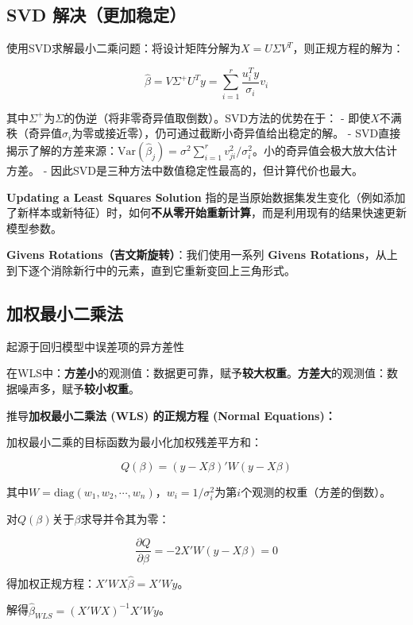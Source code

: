 \documentclass[
]{book}
\begin{document}
\subsection{SVD 解决（更加稳定）}\label{svd-ux89e3ux51b3ux66f4ux52a0ux7a33ux5b9a}

使用SVD求解最小二乘问题：将设计矩阵分解为\(X = U \Sigma V^T\)，则正规方程的解为：

\[\hat{\beta} = V \Sigma^{+} U^T y = \sum_{i=1}^{r} \frac{u_i^T y}{\sigma_i} v_i\]

其中\(\Sigma^{+}\)为\(\Sigma\)的伪逆（将非零奇异值取倒数）。SVD方法的优势在于：
- 即使\(X\)不满秩（奇异值\(\sigma_i\)为零或接近零），仍可通过截断小奇异值给出稳定的解。
- SVD直接揭示了解的方差来源：\(\text{Var}(\hat{\beta}_j) = \sigma^2 \sum_{i=1}^{r} v_{ji}^2 / \sigma_i^2\)。小的奇异值会极大放大估计方差。
- 因此SVD是三种方法中数值稳定性最高的，但计算代价也最大。

\textbf{Updating a Least Squares Solution} 指的是当原始数据集发生变化（例如添加了新样本或新特征）时，如何\textbf{不从零开始重新计算}，而是利用现有的结果快速更新模型参数。

\textbf{Givens Rotations（吉文斯旋转）}：我们使用一系列 \textbf{Givens Rotations}，从上到下逐个消除新行中的元素，直到它重新变回上三角形式。

\subsection{加权最小二乘法}\label{ux52a0ux6743ux6700ux5c0fux4e8cux4e58ux6cd5}

起源于回归模型中误差项的异方差性

在WLS中：\textbf{方差小}的观测值：数据更可靠，赋予\textbf{较大权重}。\textbf{方差大}的观测值：数据噪声多，赋予\textbf{较小权重}。

推导\textbf{加权最小二乘法 (WLS) 的正规方程 (Normal Equations)：}

加权最小二乘的目标函数为最小化加权残差平方和：

\[Q(\beta) = (y - X\beta)' W (y - X\beta)\]

其中\(W = \text{diag}(w_1, w_2, \cdots, w_n)\)，\(w_i = 1/\sigma_i^2\)为第\(i\)个观测的权重（方差的倒数）。

对\(Q(\beta)\)关于\(\beta\)求导并令其为零：

\[\frac{\partial Q}{\partial \beta} = -2 X' W (y - X\beta) = 0\]

得加权正规方程：\(X' W X \hat{\beta} = X' W y\)。

解得\(\hat{\beta}_{WLS} = (X' W X)^{-1} X' W y\)。
\end{document}
